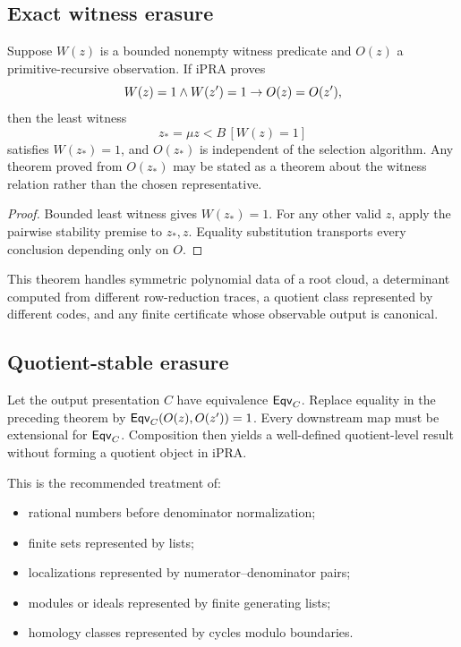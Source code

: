 \subsection{Exact witness erasure}

\begin{theorem}
Suppose \(W(z)\) is a bounded nonempty witness predicate and \(O(z)\) a
primitive-recursive observation.  If iPRA proves
\[
  W(z)=1\wedge W(z')=1\rightarrow O(z)=O(z'),
\]
then the least witness
\[
  z_*=\mu z<B\,[W(z)=1]
\]
satisfies \(W(z_*)=1\), and \(O(z_*)\) is independent of the selection
algorithm.  Any theorem proved from \(O(z_*)\) may be stated as a theorem
about the witness relation rather than the chosen representative.
\end{theorem}

\begin{proof}
Bounded least witness gives \(W(z_*)=1\).  For any other valid \(z\), apply the
pairwise stability premise to \(z_*,z\).  Equality substitution transports
every conclusion depending only on \(O\).
\end{proof}

This theorem handles symmetric polynomial data of a root cloud, a determinant
computed from different row-reduction traces, a quotient class represented by
different codes, and any finite certificate whose observable output is
canonical.

\subsection{Quotient-stable erasure}

Let the output presentation \(C\) have equivalence
\(\mathsf{Eqv}_C\).  Replace equality in the preceding theorem by
\(\mathsf{Eqv}_C(O(z),O(z'))=1\).  Every downstream map must be extensional for
\(\mathsf{Eqv}_C\).  Composition then yields a well-defined quotient-level result
without forming a quotient object in iPRA.

This is the recommended treatment of:
\begin{itemize}
\item rational numbers before denominator normalization;
\item finite sets represented by lists;
\item localizations represented by numerator--denominator pairs;
\item modules or ideals represented by finite generating lists;
\item homology classes represented by cycles modulo boundaries.
\end{itemize}

